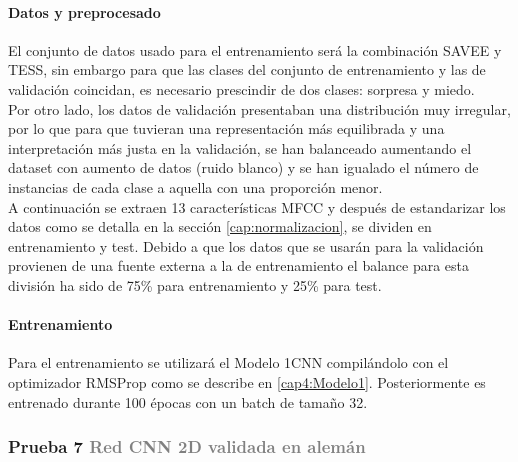 \documentclass[11pt,a4paper,spanish]{book}
\begin{document}
	\hfill\begin{minipage}{\dimexpr\textwidth-1cm}
		
		\paragraph{Datos y preprocesado}  El conjunto de datos usado para el entrenamiento será la combinación SAVEE y TESS, sin embargo para que las clases del conjunto de entrenamiento y las de validación coincidan, es necesario prescindir de dos clases: sorpresa y miedo.\\ 
		Por otro lado, los datos de validación presentaban una distribución muy irregular, por lo que para que tuvieran una representación más equilibrada y una interpretación más justa en la validación, se han balanceado aumentando el dataset con aumento de datos (ruido blanco) y se han igualado el número de instancias de cada clase a aquella con una proporción menor.\\
		A continuación se extraen 13 características MFCC y después de estandarizar los datos como se detalla en la sección \ref{cap:normalizacion}, se dividen en entrenamiento y test. Debido a que los datos que se usarán para la validación provienen de una fuente externa a la de entrenamiento el balance para esta división ha sido de 75\% para entrenamiento y 25\% para test.\\
		
		\paragraph{Entrenamiento} Para el entrenamiento se utilizará el Modelo 1CNN compilándolo con el optimizador RMSProp como se describe en \ref{cap4:Modelo1}. Posteriormente es entrenado durante 100 épocas con un batch de tamaño 32.
		
	\end{minipage}

	\subsubsection[]{\large Prueba 7 {\normalsize \textcolor{Gray}{Red CNN 2D validada en alemán}}}
	
\end{document}
